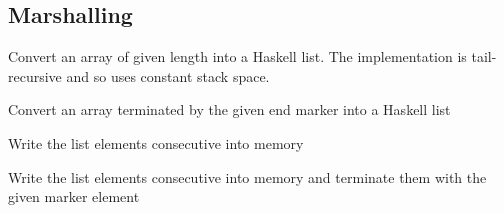 \subsection{Marshalling}
\begin{haddockdesc}
\item[\begin{tabular}{@{}l}
peekArray :: Storable a => Int -> Ptr a -> IO {\char 91}a{\char 93}
\end{tabular}]
{\haddockbegindoc
Convert an array of given length into a Haskell list.  The implementation
 is tail-recursive and so uses constant stack space.\par}
\end{haddockdesc}
\begin{haddockdesc}
\item[\begin{tabular}{@{}l}
peekArray0 :: (Storable a, Eq a) => a -> Ptr a -> IO {\char 91}a{\char 93}
\end{tabular}]
{\haddockbegindoc
Convert an array terminated by the given end marker into a Haskell list\par}
\end{haddockdesc}
\begin{haddockdesc}
\item[\begin{tabular}{@{}l}
pokeArray :: Storable a => Ptr a -> {\char 91}a{\char 93} -> IO ()
\end{tabular}]
{\haddockbegindoc
Write the list elements consecutive into memory\par}
\end{haddockdesc}
\begin{haddockdesc}
\item[\begin{tabular}{@{}l}
pokeArray0 :: Storable a => a -> Ptr a -> {\char 91}a{\char 93} -> IO ()
\end{tabular}]
{\haddockbegindoc
Write the list elements consecutive into memory and terminate them with the
 given marker element\par}
\end{haddockdesc}
